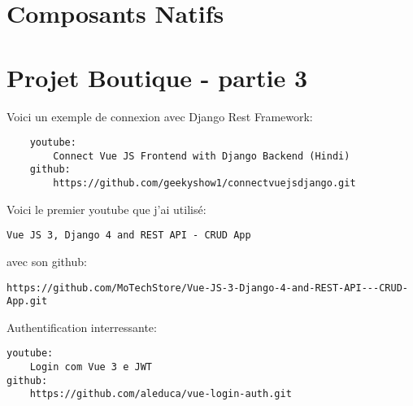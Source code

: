 \documentclass[a4paper]{book}
\begin{document}
	\chapter{Composants Natifs}
	
	\chapter{Projet Boutique - partie 3}
	
	Voici un exemple de connexion avec Django Rest Framework:
	\begin{verbatim}
	youtube:
		Connect Vue JS Frontend with Django Backend (Hindi)
	github:
		https://github.com/geekyshow1/connectvuejsdjango.git
\end{verbatim}
Voici le premier youtube que j'ai utilisé:
\begin{verbatim}
Vue JS 3, Django 4 and REST API - CRUD App
\end{verbatim}
avec son github:
\begin{verbatim}
https://github.com/MoTechStore/Vue-JS-3-Django-4-and-REST-API---CRUD-App.git
\end{verbatim}
Authentification interressante:
\begin{verbatim}
youtube:
	Login com Vue 3 e JWT
github:
	https://github.com/aleduca/vue-login-auth.git	
\end{verbatim}

    \tableofcontents    

\end{document}
